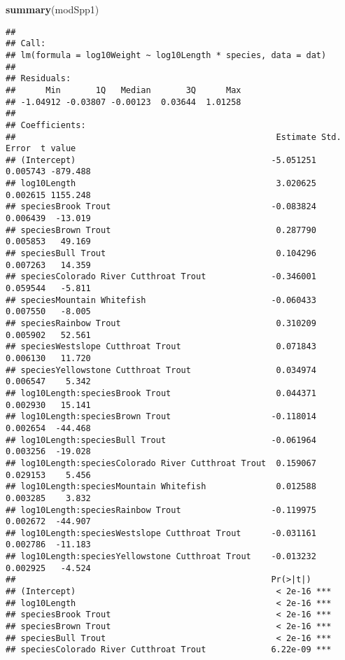 \documentclass[
  landscape]{article}
\newenvironment{Shaded}{\begin{snugshade}}{\end{snugshade}}
\newcommand{\KeywordTok}[1]{\textcolor[rgb]{0.13,0.29,0.53}{\textbf{#1}}}
\newcommand{\NormalTok}[1]{#1}
\begin{document}
\begin{Shaded}
\begin{Highlighting}[]
\KeywordTok{summary}\NormalTok{(modSpp1)}
\end{Highlighting}
\end{Shaded}

\begin{verbatim}
## 
## Call:
## lm(formula = log10Weight ~ log10Length * species, data = dat)
## 
## Residuals:
##      Min       1Q   Median       3Q      Max 
## -1.04912 -0.03807 -0.00123  0.03644  1.01258 
## 
## Coefficients:
##                                                    Estimate Std. Error  t value
## (Intercept)                                       -5.051251   0.005743 -879.488
## log10Length                                        3.020625   0.002615 1155.248
## speciesBrook Trout                                -0.083824   0.006439  -13.019
## speciesBrown Trout                                 0.287790   0.005853   49.169
## speciesBull Trout                                  0.104296   0.007263   14.359
## speciesColorado River Cutthroat Trout             -0.346001   0.059544   -5.811
## speciesMountain Whitefish                         -0.060433   0.007550   -8.005
## speciesRainbow Trout                               0.310209   0.005902   52.561
## speciesWestslope Cutthroat Trout                   0.071843   0.006130   11.720
## speciesYellowstone Cutthroat Trout                 0.034974   0.006547    5.342
## log10Length:speciesBrook Trout                     0.044371   0.002930   15.141
## log10Length:speciesBrown Trout                    -0.118014   0.002654  -44.468
## log10Length:speciesBull Trout                     -0.061964   0.003256  -19.028
## log10Length:speciesColorado River Cutthroat Trout  0.159067   0.029153    5.456
## log10Length:speciesMountain Whitefish              0.012588   0.003285    3.832
## log10Length:speciesRainbow Trout                  -0.119975   0.002672  -44.907
## log10Length:speciesWestslope Cutthroat Trout      -0.031161   0.002786  -11.183
## log10Length:speciesYellowstone Cutthroat Trout    -0.013232   0.002925   -4.524
##                                                   Pr(>|t|)    
## (Intercept)                                        < 2e-16 ***
## log10Length                                        < 2e-16 ***
## speciesBrook Trout                                 < 2e-16 ***
## speciesBrown Trout                                 < 2e-16 ***
## speciesBull Trout                                  < 2e-16 ***
## speciesColorado River Cutthroat Trout             6.22e-09 ***

\end{verbatim}
\end{document}
